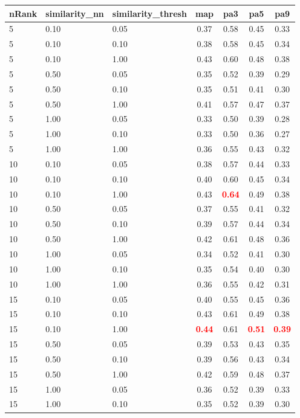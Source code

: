 \begin{tabular}{lllcccc} 
nRank & similarity\_nn & similarity\_thresh & map & pa3 & pa5 & pa9 \\ 
\hline 
 5 & 0.10 & 0.05 & 0.37 & 0.58 & 0.45 & 0.33 \\ 
 5 & 0.10 & 0.10 & 0.38 & 0.58 & 0.45 & 0.34 \\ 
 5 & 0.10 & 1.00 & 0.43 & 0.60 & 0.48 & 0.38 \\ 
 5 & 0.50 & 0.05 & 0.35 & 0.52 & 0.39 & 0.29 \\ 
 5 & 0.50 & 0.10 & 0.35 & 0.51 & 0.41 & 0.30 \\ 
 5 & 0.50 & 1.00 & 0.41 & 0.57 & 0.47 & 0.37 \\ 
 5 & 1.00 & 0.05 & 0.33 & 0.50 & 0.39 & 0.28 \\ 
 5 & 1.00 & 0.10 & 0.33 & 0.50 & 0.36 & 0.27 \\ 
 5 & 1.00 & 1.00 & 0.36 & 0.55 & 0.43 & 0.32 \\ 
10 & 0.10 & 0.05 & 0.38 & 0.57 & 0.44 & 0.33 \\ 
10 & 0.10 & 0.10 & 0.40 & 0.60 & 0.45 & 0.34 \\ 
10 & 0.10 & 1.00 & 0.43 & \textbf{\textcolor{red}{0.64}} & 0.49 & 0.38 \\ 
10 & 0.50 & 0.05 & 0.37 & 0.55 & 0.41 & 0.32 \\ 
10 & 0.50 & 0.10 & 0.39 & 0.57 & 0.44 & 0.34 \\ 
10 & 0.50 & 1.00 & 0.42 & 0.61 & 0.48 & 0.36 \\ 
10 & 1.00 & 0.05 & 0.34 & 0.52 & 0.41 & 0.30 \\ 
10 & 1.00 & 0.10 & 0.35 & 0.54 & 0.40 & 0.30 \\ 
10 & 1.00 & 1.00 & 0.36 & 0.55 & 0.42 & 0.31 \\ 
15 & 0.10 & 0.05 & 0.40 & 0.55 & 0.45 & 0.36 \\ 
15 & 0.10 & 0.10 & 0.43 & 0.61 & 0.49 & 0.38 \\ 
15 & 0.10 & 1.00 & \textbf{\textcolor{red}{0.44}} & 0.61 & \textbf{\textcolor{red}{0.51}} & \textbf{\textcolor{red}{0.39}} \\ 
15 & 0.50 & 0.05 & 0.39 & 0.53 & 0.43 & 0.35 \\ 
15 & 0.50 & 0.10 & 0.39 & 0.56 & 0.43 & 0.34 \\ 
15 & 0.50 & 1.00 & 0.42 & 0.59 & 0.48 & 0.37 \\ 
15 & 1.00 & 0.05 & 0.36 & 0.52 & 0.39 & 0.33 \\ 
15 & 1.00 & 0.10 & 0.35 & 0.52 & 0.39 & 0.30 \\ 

\end{tabular}
